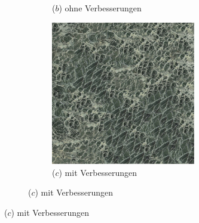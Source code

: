 \begin{figure}
\begin{subfigure}{0.9\textwidth}
\begin{subfigure}{0.3\textwidth}
		\caption*{($b$) ohne Verbesserungen}
	\end{subfigure}
	\hfill
	\begin{subfigure}{0.3\textwidth}
		\centering
		\includegraphics[width=0.9\textwidth]{images/example-2-with}
		\caption*{($c$) mit Verbesserungen}
	\end{subfigure}
	

\end{subfigure}
\end{figure}
